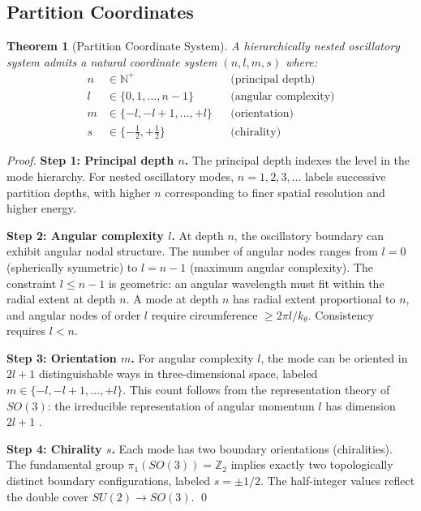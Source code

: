 \documentclass[twocolumn,10pt,a4paper]{article}
\newtheorem{theorem}{Theorem}[section]
\theoremstyle{definition}
\theoremstyle{remark}
\newcommand{\Natural}{\mathbb{N}}
\begin{document}
\subsection{Partition Coordinates}

\begin{theorem}[Partition Coordinate System]
\label{thm:coordinates}
A hierarchically nested oscillatory system admits a natural coordinate system $(n, l, m, s)$ where:
\begin{align}
    n &\in \Natural^+ && \text{(principal depth)} \\
    l &\in \{0, 1, \ldots, n-1\} && \text{(angular complexity)} \\
    m &\in \{-l, -l+1, \ldots, +l\} && \text{(orientation)} \\
    s &\in \{-\tfrac{1}{2}, +\tfrac{1}{2}\} && \text{(chirality)}
\end{align}
\end{theorem}

\begin{proof}
\textbf{Step 1: Principal depth $n$.}
The principal depth indexes the level in the mode hierarchy. For nested oscillatory modes, $n = 1, 2, 3, \ldots$ labels successive partition depths, with higher $n$ corresponding to finer spatial resolution and higher energy.

\textbf{Step 2: Angular complexity $l$.}
At depth $n$, the oscillatory boundary can exhibit angular nodal structure. The number of angular nodes ranges from $l = 0$ (spherically symmetric) to $l = n-1$ (maximum angular complexity). The constraint $l \leq n-1$ is geometric: an angular wavelength must fit within the radial extent at depth $n$. A mode at depth $n$ has radial extent proportional to $n$, and angular nodes of order $l$ require circumference $\geq 2\pi l/k_\theta$. Consistency requires $l < n$.

\textbf{Step 3: Orientation $m$.}
For angular complexity $l$, the mode can be oriented in $2l + 1$ distinguishable ways in three-dimensional space, labeled $m \in \{-l, -l+1, \ldots, +l\}$. This count follows from the representation theory of $SO(3)$: the irreducible representation of angular momentum $l$ has dimension $2l + 1$ \citep{hall2015,hamermesh1962}.

\textbf{Step 4: Chirality $s$.}
Each mode has two boundary orientations (chiralities). The fundamental group $\pi_1(SO(3)) = \mathbb{Z}_2$ implies exactly two topologically distinct boundary configurations, labeled $s = \pm 1/2$. The half-integer values reflect the double cover $SU(2) \to SO(3)$. \qed
\end{proof}
\end{document}
